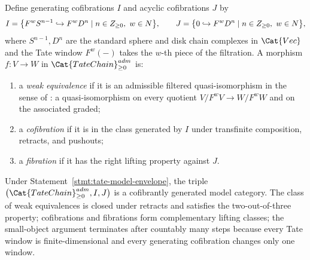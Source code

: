 \begin{defn}
  \label{defn:tate-model}
  Define generating cofibrations $I$ and acyclic cofibrations $J$
  by
  $$I=\bigl\{F^w S^{n-1}\hookrightarrow F^w D^n
       \mid n\in Z_{\geq 0},\ w\in N\bigr\},\qquad
    J=\bigl\{0\hookrightarrow F^w D^n
       \mid n\in Z_{\geq 0},\ w\in N\bigr\},$$
  where $S^{n-1},D^n$ are the standard sphere and disk chain
  complexes in $\Cat{Vec}$ and the Tate window $F^w(-)$ takes the
  $w$-th piece of the filtration. A morphism $f\colon V\to W$ in
  $\Cat{TateChain}_{\geq 0}^{\mathrm{adm}}$ is:
  \begin{enumerate}
    \item a \emph{weak equivalence} if it is an admissible filtered
      quasi-isomorphism in the sense of \alpharef:
      a quasi-isomorphism on every quotient $V/F^wV\to W/F^wW$ and
      on the associated graded;
    \item a \emph{cofibration} if it is in the class generated by
      $I$ under transfinite composition, retracts, and pushouts;
    \item a \emph{fibration} if it has the right lifting property
      against $J$.
  \end{enumerate}
\end{defn}

\begin{thm}
  \label{thm:tate-model-structure}
  Under Statement~\ref{stmt:tate-model-envelope}, the triple
  \(\bigl(\Cat{TateChain}_{\geq 0}^{\mathrm{adm}},I,J\bigr)\)
  is a cofibrantly generated model category. The class of weak equivalences is
  closed under retracts and satisfies the two-out-of-three
  property; cofibrations and fibrations form complementary lifting
  classes; the small-object argument terminates after countably
  many steps because every Tate window is finite-dimensional and
  every generating cofibration changes only one window.
\end{thm}

